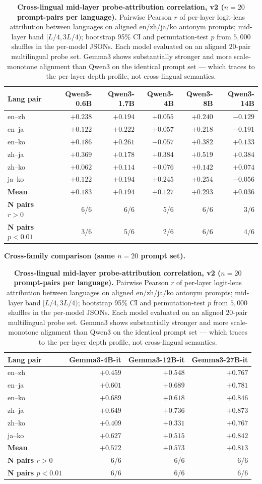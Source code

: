 \begin{table}[h]
\centering
\caption{\textbf{Cross-lingual mid-layer probe-attribution correlation, v2 ($n=20$ prompt-pairs per language).} Pairwise Pearson $r$ of per-layer logit-lens attribution between languages on aligned en/zh/ja/ko antonym prompts; mid-layer band $[L/4, 3L/4)$; bootstrap 95\% CI and permutation-test $p$ from $5{,}000$ shuffles in the per-model JSONs. Each model evaluated on an aligned $20$-pair multilingual probe set. Gemma3 shows substantially stronger and more scale-monotone alignment than Qwen3 on the identical prompt set --- which  traces to the per-layer depth profile, not cross-lingual semantics.}
\label{tab:probe_attribution}
\small
\begin{tabular}{lrrrrr}
\toprule
Lang pair & Qwen3-0.6B & Qwen3-1.7B & Qwen3-4B & Qwen3-8B & Qwen3-14B \\
\midrule
en--zh & $+0.238$ & $+0.194$ & $+0.055$ & $+0.240$ & $-0.129$ \\
en--ja & $+0.122$ & $+0.222$ & $+0.057$ & $+0.218$ & $-0.191$ \\
en--ko & $+0.186$ & $+0.261$ & $-0.057$ & $+0.382$ & $+0.133$ \\
zh--ja & $+0.369$ & $+0.178$ & $+0.384$ & $+0.519$ & $+0.384$ \\
zh--ko & $+0.062$ & $+0.114$ & $+0.076$ & $+0.142$ & $+0.074$ \\
ja--ko & $+0.122$ & $+0.194$ & $+0.245$ & $+0.254$ & $-0.056$ \\
\midrule
\textbf{Mean} & $\mathbf{+0.183}$ & $\mathbf{+0.194}$ & $\mathbf{+0.127}$ & $\mathbf{+0.293}$ & $+0.036$ \\
\textbf{N pairs $r>0$} & 6/6 & 6/6 & 5/6 & 6/6 & 3/6 \\
\textbf{N pairs $p<0.01$} & 3/6 & 5/6 & 2/6 & 6/6 & 4/6 \\
\bottomrule
\end{tabular}

\medskip\noindent\textbf{Cross-family comparison (same $n=20$ prompt set).}\\[2pt]
\begin{tabular}{lrrr}
\toprule
Lang pair & Gemma3-4B-it & Gemma3-12B-it & Gemma3-27B-it \\
\midrule
en--zh & $+0.459$ & $+0.548$ & $+0.767$ \\
en--ja & $+0.601$ & $+0.689$ & $+0.781$ \\
en--ko & $+0.689$ & $+0.618$ & $+0.846$ \\
zh--ja & $+0.649$ & $+0.736$ & $+0.873$ \\
zh--ko & $+0.409$ & $+0.331$ & $+0.767$ \\
ja--ko & $+0.627$ & $+0.515$ & $+0.842$ \\
\midrule
\textbf{Mean} & $\mathbf{+0.572}$ & $\mathbf{+0.573}$ & $\mathbf{+0.813}$ \\
\textbf{N pairs $r>0$} & 6/6 & 6/6 & 6/6 \\
\textbf{N pairs $p<0.01$} & 6/6 & 6/6 & 6/6 \\
\bottomrule
\end{tabular}
\end{table}

